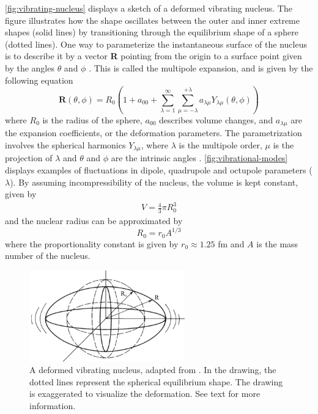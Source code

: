 \documentclass[twoside,english]{uiofysmaster/uiofysmaster}
\let\orgautoref\autoref
\renewcommand{\autoref}
        {%
		 \def\sectionautorefname{Section}%
		 \def\subsectionautorefname{Section}%
		 \def\subsubsectionautorefname{Section}%
		 \def\chapterautorefname{Chapter}%
          \orgautoref}
\begin{document}
\autoref{fig:vibrating-nucleus} displays a sketch of a deformed vibrating nucleus.
The figure illustrates how the shape oscillates between the outer and inner extreme shapes (solid lines) by transitioning through the equilibrium shape of a sphere (dotted lines). 
One way to parameterize the instantaneous surface of the nucleus is to describe it by a vector \textbf{R} pointing from the origin to a surface point given by the angles $\theta$ and $\phi$ \cite{Krane}.
This is called the multipole expansion, and is given by the following equation
\begin{equation}\label{eq:Rfull}
	\mathbf{R}(\theta, \phi) = R_0 \left( 1 + a_{00} + \sum^\infty_{\lambda = 1} \sum^{+\lambda}_{\mu = -\lambda} a_{\lambda \mu} Y_{\lambda \mu}(\theta, \phi) \right)
\end{equation}
where $R_0$ is the radius of the sphere, $a_{00}$ describes volume changes, and $a_{\lambda \mu}$ are the expansion coefficients, or the deformation parameters. 
The parametrization involves the spherical harmonics $Y_{\lambda \mu}$, where $\lambda$ is the multipole order, $\mu$ is the projection of $\lambda$ and $\theta$ and $\phi$ are the intrinsic angles \cite{Krane, RS, Klintefjord}.
\autoref{fig:vibrational-modes} displays examples of fluctuations in dipole, quadrupole and octupole parameters ($\lambda$). 
By assuming incompressibility of the nucleus, the volume is kept constant, given by
\begin{align*}
	V = \frac{4}{3} \pi R_0^3
\end{align*}
and the nuclear radius can be approximated by 
\begin{equation}\label{eq:radius}
	R_0 = r_0 A^{1/3}
\end{equation}
where the proportionality constant is given by $r_0 \approx 1.25$ fm and $A$ is the mass number of the nucleus.

\begin{figure}[ht]
	\centering
	\includegraphics[width=0.6\textwidth]{Images/vibrating-nucleus.png}
	\caption{A deformed vibrating nucleus, adapted from \cite{Krane}. 
	In the drawing, the dotted lines represent the spherical equilibrium shape. 
	The drawing is exaggerated to visualize the deformation. 
	See text for more information.}
	\label{fig:vibrating-nucleus}
\end{figure}
\end{document}

